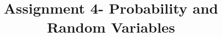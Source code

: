 \documentclass[journal,12pt,twocolumn]{IEEEtran}
\DeclareMathOperator*{\Res}{Res}
\begin{document}
\newcommand{\BEQA}{\begin{eqnarray}}
\newcommand{\EEQA}{\end{eqnarray}}
\newcommand{\define}{\stackrel{\triangle}{=}}

\raggedbottom
\setlength{\parindent}{0pt}
\providecommand{\mbf}{\mathbf}
\providecommand{\pr}[1]{\ensuremath{\Pr\left(#1\right)}}
\providecommand{\qfunc}[1]{\ensuremath{Q\left(#1\right)}}
\providecommand{\sbrak}[1]{\ensuremath{{}\left[#1\right]}}
\providecommand{\lsbrak}[1]{\ensuremath{{}\left[#1\right.}}
\providecommand{\rsbrak}[1]{\ensuremath{{}\left.#1\right]}}
\providecommand{\brak}[1]{\ensuremath{\left(#1\right)}}
\providecommand{\lbrak}[1]{\ensuremath{\left(#1\right.}}
\providecommand{\rbrak}[1]{\ensuremath{\left.#1\right)}}
\providecommand{\cbrak}[1]{\ensuremath{\left\{#1\right\}}}
\providecommand{\lcbrak}[1]{\ensuremath{\left\{#1\right.}}
\providecommand{\rcbrak}[1]{\ensuremath{\left.#1\right\}}}
\theoremstyle{remark}
\newtheorem{rem}{Remark}
\newcommand{\sgn}{\mathop{\mathrm{sgn}}}
\providecommand{\abs}[1]{\vert#1\vert}
\providecommand{\res}[1]{\Res\displaylimits_{#1}} 
\providecommand{\norm}[1]{\lVert#1\rVert}
\providecommand{\mtx}[1]{\mathbf{#1}}
\providecommand{\mean}[1]{E[ #1 ]}
\providecommand{\fourier}{\overset{\mathcal{F}}{ \rightleftharpoons}}
\providecommand{\system}{\overset{\mathcal{H}}{ \longleftrightarrow}}
\newcommand{\solution}{\noindent \textbf{Solution: }}
\newcommand{\cosec}{\,\text{cosec}\,}
\providecommand{\dec}[2]{\ensuremath{\overset{#1}{\underset{#2}{\gtrless}}}}
\newcommand{\myvec}[1]{\ensuremath{\begin{pmatrix}#1\end{pmatrix}}}
\newcommand{\mydet}[1]{\ensuremath{\begin{vmatrix}#1\end{vmatrix}}}
\makeatletter
{}
\makeatother
\let\StandardTheFigure\thefigure
\let\vec\mathbf
\renewcommand{\thefigure}{\theproblem}
\def\putbox#1#2#3{\makebox[0in][l]{\makebox[#1][l]{}\raisebox{\baselineskip}[0in][0in]{\raisebox{#2}[0in][0in]{#3}}}}
     \def\rightbox#1{\makebox[0in][r]{#1}}
     \def\centbox#1{\makebox[0in]{#1}}
     \def\topbox#1{\raisebox{-\baselineskip}[0in][0in]{#1}}
     \def\midbox#1{\raisebox{-0.5\baselineskip}[0in][0in]{#1}}
\vspace{3cm}
\title{Assignment 4- Probability and Random Variables}
\end{document}
